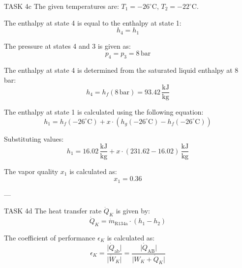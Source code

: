 TASK 4c  
The given temperatures are:  
\( T_1 = -26^\circ\text{C} \), \( T_2 = -22^\circ\text{C} \).  

The enthalpy at state 4 is equal to the enthalpy at state 1:  
\[
h_4 = h_1
\]  

The pressure at states 4 and 3 is given as:  
\[
p_4 = p_3 = 8 \, \text{bar}
\]  

The enthalpy at state 4 is determined from the saturated liquid enthalpy at 8 bar:  
\[
h_4 = h_f(8 \, \text{bar}) = 93.42 \, \frac{\text{kJ}}{\text{kg}}
\]  

The enthalpy at state 1 is calculated using the following equation:  
\[
h_1 = h_f(-26^\circ\text{C}) + x \cdot \left(h_g(-26^\circ\text{C}) - h_f(-26^\circ\text{C})\right)
\]  

Substituting values:  
\[
h_1 = 16.02 \, \frac{\text{kJ}}{\text{kg}} + x \cdot \left(231.62 - 16.02\right) \, \frac{\text{kJ}}{\text{kg}}
\]  

The vapor quality \( x_1 \) is calculated as:  
\[
x_1 = 0.36
\]  

---

TASK 4d  
The heat transfer rate \( \dot{Q}_K \) is given by:  
\[
\dot{Q}_K = \dot{m}_{\text{R134a}} \cdot (h_1 - h_2)
\]  

The coefficient of performance \( \epsilon_K \) is calculated as:  
\[
\epsilon_K = \frac{\lvert \dot{Q}_{\text{ab}} \rvert}{\lvert \dot{W}_K \rvert} = \frac{\lvert \dot{Q}_{\text{AB}} \rvert}{\lvert W_K + \dot{Q}_K \rvert}
\]  